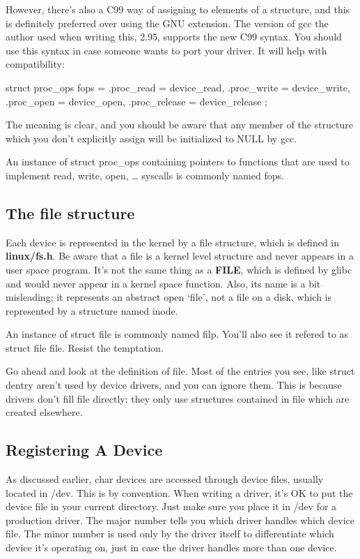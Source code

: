 \documentclass[10pt, oneside]{book}
\begin{document}
However, there's also a C99 way of assigning to elements of a structure, and this is definitely preferred over using the GNU extension. The version of gcc the author used when writing this, 2.95, supports the new C99 syntax. You should use this syntax in case someone wants to port your driver. It will help with compatibility:

\begin{code}
struct proc_ops fops = {
	.proc_read = device_read,
	.proc_write = device_write,
	.proc_open = device_open,
	.proc_release = device_release
};
\end{code}

The meaning is clear, and you should be aware that any member of the structure which you don't explicitly assign will be initialized to NULL by gcc.

An instance of struct proc\_ops containing pointers to functions that are used to implement read, write, open, \ldots{} syscalls is commonly named fops.

\subsection{The file structure}
\label{sec:org8eca273}

Each device is represented in the kernel by a file structure, which is defined in \textbf{linux/fs.h}. Be aware that a file is a kernel level structure and never appears in a user space program. It's not the same thing as a \textbf{FILE}, which is defined by glibc and would never appear in a kernel space function. Also, its name is a bit misleading; it represents an abstract open `file', not a file on a disk, which is represented by a structure named inode.

An instance of struct file is commonly named filp. You'll also see it refered to as struct file file. Resist the temptation.

Go ahead and look at the definition of file. Most of the entries you see, like struct dentry aren't used by device drivers, and you can ignore them. This is because drivers don't fill file directly; they only use structures contained in file which are created elsewhere.

\subsection{Registering A Device}
\label{sec:org64e0a84}
As discussed earlier, char devices are accessed through device files, usually located in /dev. This is by convention. When writing a driver, it's OK to put the device file in your current directory. Just make sure you place it in /dev for a production driver. The major number tells you which driver handles which device file. The minor number is used only by the driver itself to differentiate which device it's operating on, just in case the driver handles more than one device.
\end{document}
